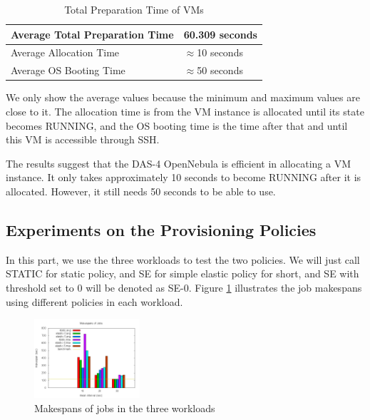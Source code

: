 \begin{table}
\caption{Total Preparation Time of VMs}
\label{table_vm_preparation}
\centering
\begin{tabular}{|l|l|}
\hline
Average Total Preparation Time & 60.309 seconds \\
\hline
Average Allocation Time & $\approx$10 seconds \\
\hline
Average OS Booting Time & $\approx$50 seconds \\
\hline
\end{tabular}
\end{table}

We only show the average values because the minimum and maximum values
are close to it. The allocation time is from the VM instance is
allocated until its state becomes RUNNING, and the OS booting time is
the time after that and until this VM is accessible through SSH.

The results suggest that the DAS-4 OpenNebula is efficient in
allocating a VM instance. It only takes approximately 10 seconds to
become RUNNING after it is allocated. However, it still needs 50
seconds to be able to use.


\subsection{Experiments on the Provisioning Policies}
In this part, we use the three workloads to test the two policies. We
will just call STATIC for static policy, and SE for simple elastic
policy for short, and SE with threshold set to 0 will be denoted as
SE-0. Figure \ref{figure_jobmakespan} illustrates the job makespans
using different policies in each workload.

\begin{figure}[!t]
\centering
\includegraphics[width=0.35\textwidth]{pictures/all-makespans.png}
\caption{Makespans of jobs in the three workloads}
\label{figure_jobmakespan}
\end{figure}

